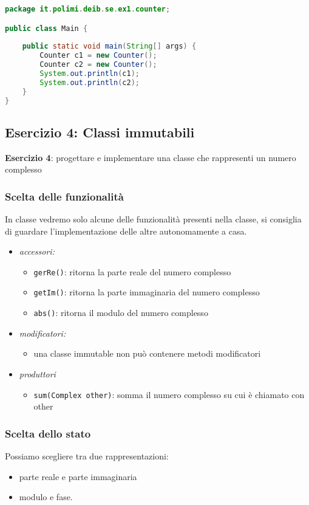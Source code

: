\documentclass{article}
\begin{document}
\begin{lstlisting}[language=Java,escapechar=|]
package it.polimi.deib.se.ex1.counter;

public class Main {
	
	public static void main(String[] args) {
		Counter c1 = new Counter();
		Counter c2 = new Counter();
		System.out.println(c1);
		System.out.println(c2);
	}
}
\end{lstlisting}


\subsection{Esercizio 4: Classi immutabili}
\begin{framed}
\textbf{Esercizio 4}:  progettare e implementare una classe che rappresenti un numero complesso
\end{framed}


\subsubsection{Scelta delle funzionalit\`a}
In classe vedremo solo alcune delle funzionalit\`a presenti nella classe, si consiglia di guardare l'implementazione delle altre autonomamente a casa.
\begin{itemize}
\item \emph{accessori:} 
\begin{itemize}
\item \texttt{gerRe()}: ritorna la parte reale del numero complesso
\item \texttt{getIm()}: ritorna la parte immaginaria del numero complesso
\item \texttt{abs()}: ritorna il modulo del numero complesso
\end{itemize}
\item \emph{modificatori:}
\begin{itemize}
\item una classe immutable non pu\`o contenere metodi modificatori
\end{itemize}
\item \emph{produttori}
\begin{itemize}
\item \texttt{sum(Complex other)}: somma il numero complesso su cui \`e chiamato con other
\end{itemize}
\end{itemize}


\subsubsection{Scelta dello stato}
Possiamo scegliere tra due rappresentazioni:
\begin{itemize}
\item parte reale e parte immaginaria 
\item modulo e fase.
\end{itemize}
\end{document}
